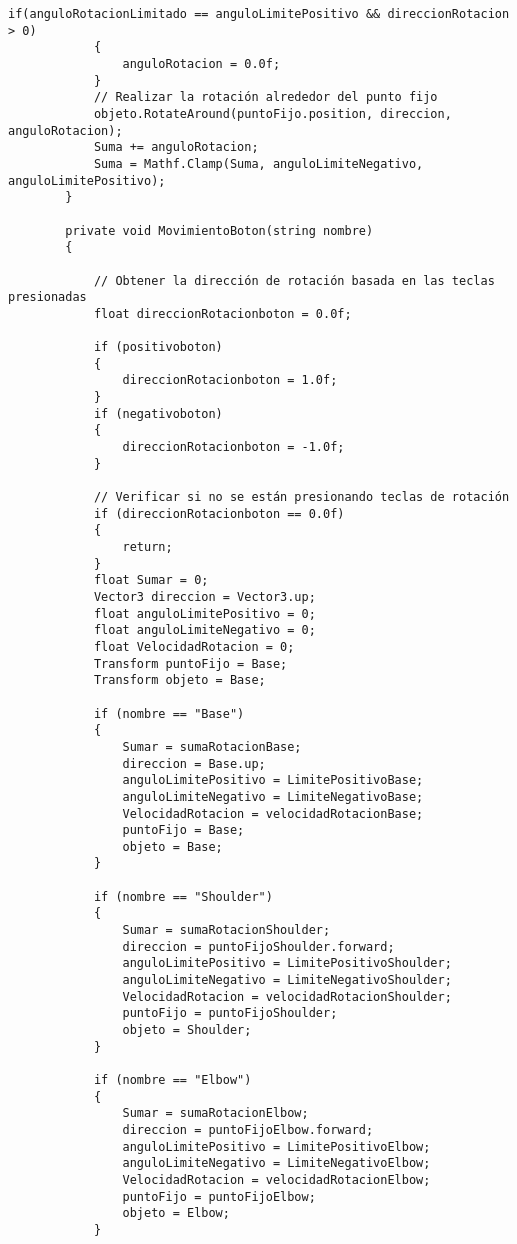 \begin{lstlisting}[frame=single]
            if(anguloRotacionLimitado == anguloLimitePositivo && direccionRotacion > 0)
            {
                anguloRotacion = 0.0f;
            }
            // Realizar la rotación alrededor del punto fijo
            objeto.RotateAround(puntoFijo.position, direccion, anguloRotacion);
            Suma += anguloRotacion;
            Suma = Mathf.Clamp(Suma, anguloLimiteNegativo, anguloLimitePositivo);
        }

        private void MovimientoBoton(string nombre)
        {
            
            // Obtener la dirección de rotación basada en las teclas presionadas
            float direccionRotacionboton = 0.0f;

            if (positivoboton)
            {
                direccionRotacionboton = 1.0f;
            }
            if (negativoboton)
            {
                direccionRotacionboton = -1.0f;
            }

            // Verificar si no se están presionando teclas de rotación
            if (direccionRotacionboton == 0.0f)
            {
                return;
            }
            float Sumar = 0;
            Vector3 direccion = Vector3.up;
            float anguloLimitePositivo = 0;
            float anguloLimiteNegativo = 0;
            float VelocidadRotacion = 0;
            Transform puntoFijo = Base;
            Transform objeto = Base;

            if (nombre == "Base")
            {
                Sumar = sumaRotacionBase;
                direccion = Base.up;
                anguloLimitePositivo = LimitePositivoBase;
                anguloLimiteNegativo = LimiteNegativoBase;
                VelocidadRotacion = velocidadRotacionBase;
                puntoFijo = Base;
                objeto = Base;
            }

            if (nombre == "Shoulder")
            {
                Sumar = sumaRotacionShoulder;
                direccion = puntoFijoShoulder.forward;
                anguloLimitePositivo = LimitePositivoShoulder;
                anguloLimiteNegativo = LimiteNegativoShoulder;
                VelocidadRotacion = velocidadRotacionShoulder;
                puntoFijo = puntoFijoShoulder;
                objeto = Shoulder;
            }

            if (nombre == "Elbow")
            {
                Sumar = sumaRotacionElbow;
                direccion = puntoFijoElbow.forward;
                anguloLimitePositivo = LimitePositivoElbow;
                anguloLimiteNegativo = LimiteNegativoElbow;
                VelocidadRotacion = velocidadRotacionElbow;
                puntoFijo = puntoFijoElbow;
                objeto = Elbow;
            }


\end{lstlisting}
